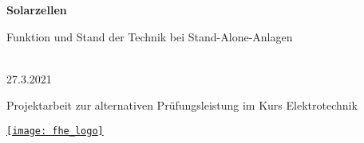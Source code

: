 \begin{titlepage}
    \begin{center}
        \Huge
        \textbf{Solarzellen}

        \vspace{0.5cm}

        \LARGE
        Funktion und Stand der Technik bei Stand-Alone-Anlagen

        \vspace{1.5cm}

        \href{mailto:erik.buennig@fh-erfurt.de}{
        }\\
        27.3.2021

        \vfill

        \Large
        Projektarbeit zur alternativen Prüfungsleistung im Kurs Elektrotechnik

        \vspace{1.5cm}

        \href{https://www.fh-erfurt.de/fhe/}{
            \texttt{[image: fhe\_logo]}
        }
    \end{center}
\end{titlepage}